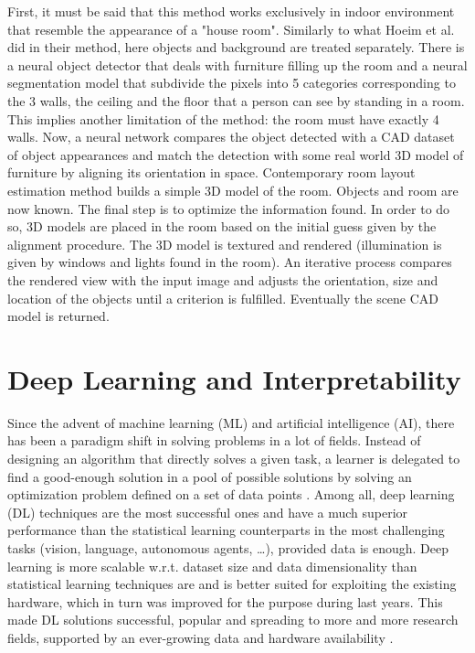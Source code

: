 First, it must be said that this method works exclusively in indoor environment that resemble the appearance of a "house room".
Similarly to what Hoeim et al. did in their method, here objects and background are treated separately.
There is a neural object detector that deals with furniture filling up the room and a neural segmentation model that subdivide the pixels into 5 categories corresponding to the 3 walls, the ceiling and the floor that a person can see by standing in a room.
This implies another limitation of the method: the room must have exactly 4 walls.
Now, a neural network compares the object detected with a CAD dataset of object appearances and match the detection with some real world 3D model of furniture by aligning its orientation in space.
Contemporary room layout estimation method builds a simple 3D model of the room.
Objects and room are now known.
The final step is to optimize the information found.
In order to do so, 3D models are placed in the room based on the initial guess given by the alignment procedure.
The 3D model is textured and rendered (illumination is given by windows and lights found in the room).
An iterative process compares the rendered view with the input image and adjusts the orientation, size and location of the objects until a criterion is fulfilled.
Eventually the scene CAD model is returned.

\section{Deep Learning and Interpretability}
\label{sec:deep learning and interpretability}
Since the advent of machine learning (ML) and artificial intelligence (AI), there has been a paradigm shift in solving problems in a lot of fields.
Instead of designing an algorithm that directly solves a given task, a learner is delegated to find a good-enough solution in a pool of possible solutions by solving an optimization problem defined on a set of data points \cite{ML_book}.
Among all, deep learning (DL) techniques are the most successful ones and have a much superior performance than the statistical learning counterparts in the most challenging tasks (vision, language, autonomous agents, …), provided data is enough.
Deep learning is more scalable w.r.t. dataset size and data dimensionality than statistical learning techniques are and is better suited for exploiting the existing hardware, which in turn was improved for the purpose during last years.
This made DL solutions successful, popular and spreading to more and more research fields, supported by an ever-growing data and hardware availability \cite{DL_overview}.

